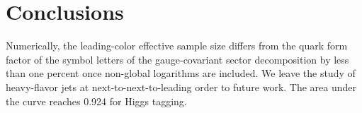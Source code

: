 \section{Conclusions}\label{sec:conclusions}

Numerically, the leading-color effective sample size differs from the
quark form factor of the symbol letters of the gauge-covariant sector
decomposition by less than one percent once non-global logarithms are
included. We leave the study of heavy-flavor jets at
next-to-next-to-leading order to future work. The area under the curve
reaches 0.924 for Higgs tagging.

